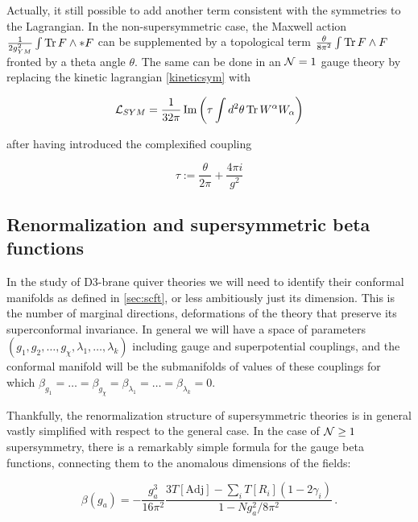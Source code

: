 Actually, it still possible to add another term consistent with the symmetries to the Lagrangian. In the non-supersymmetric case, the Maxwell action $\frac{1}{2g_{YM}^2} \int \operatorname{Tr} F \wedge \ast F$ can be supplemented by a topological term $\frac{\theta}{8\pi^2} \int \operatorname{Tr} F \wedge F$ fronted by a theta angle $\theta$. The same can be done in an $\mathcal{N} = 1$ gauge theory by replacing the kinetic lagrangian \eqref{kineticsym} with

\begin{equation}
	\mathcal{L}_{SYM} = \frac{1}{32\pi} \operatorname{Im} \left( \tau \int d^2 \theta \operatorname{Tr} W^\alpha W_\alpha \right)
	\label{kineticsymtau}
\end{equation}

after having introduced the complexified coupling

\begin{equation}
	\tau := \frac{\theta}{2\pi} + \frac{4\pi i}{g^2}
	\label{complexcoupling}
\end{equation}

\subsection{Renormalization and supersymmetric beta functions}

In the study of D3-brane quiver theories we will need to identify their conformal manifolds as defined in \ref{sec:scft}, or less ambitiously just its dimension. This is the number of marginal directions, deformations of the theory that preserve its superconformal invariance. In general we will have a space of parameters $(g_1, g_2, \ldots, g_\chi, \lambda_1, \ldots, \lambda_k)$ including gauge and superpotential couplings, and the conformal manifold will be the submanifolds of values of these couplings for which $\beta_{g_1} = \ldots = \beta_{g_\chi} = \beta_{\lambda_1} = \ldots = \beta_{\lambda_k} = 0$.

Thankfully, the renormalization structure of supersymmetric theories is in general vastly simplified with respect to the general case. In the case of $\mathcal{N} \geq 1$ supersymmetry, there is a remarkably simple formula for the gauge beta functions, connecting them to the anomalous dimensions of the fields:

\begin{equation}
	\beta(g_a) = - \frac{g_a^3}{16\pi^2} \frac{3 T[\mathrm{Adj}] - \sum_i T[R_i] (1- 2\gamma_i) }{1-Ng_a^2 / 8\pi^2 }\,.
	\label{nszv}
\end{equation}


